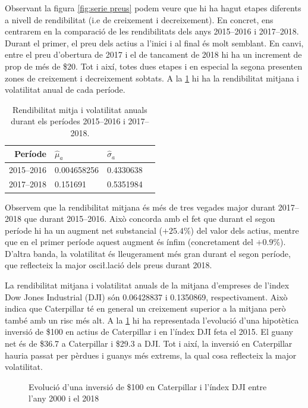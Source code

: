 \documentclass{article}
\numberwithin{table}{section}
\numberwithin{figure}{section}
\numberwithin{equation}{section}
\begin{document}
Observant la figura \ref{fig:serie preus} podem veure que hi ha hagut etapes diferents a nivell de rendibilitat (i.e de creixement i decreixement). En concret, ens centrarem en la comparació de les rendibilitats dels anys 2015--2016 i 2017--2018. Durant el primer, el preu dels actius a l'inici i al final és molt semblant. En canvi, entre el preu d'obertura de 2017 i el de tancament de 2018 hi ha un increment de prop de més de \$20. Tot i així, totes dues etapes i en especial la segona presenten zones de creixement i decreixement sobtats. A la \cref{tab:estim} hi ha la rendibilitat mitjana i volatilitat anual de cada període. 
\begin{table}[htb]
	\small \sffamily \centering
	\caption{Rendibilitat mitja i volatilitat anuals durant els períodes 2015--2016 i 2017--2018.}
	\label{tab:estim}
	\begin{tabular}{@{}rlll@{}}
		\toprule 
		Període & \( \hat{\mu}_a \) & \( \hat{\sigma}_a \) \\
		\midrule
		2015--2016 & \num{0.004658256} & \num{0.4330638} \\ 
		2017--2018 & \num{0.151691}   & \num{0.5351984}   \\ 
	\end{tabular}
\end{table}
Observem que la rendibilitat mitjana és més de tres vegades major durant 2017--2018 que durant 2015--2016. Això concorda amb el fet que durant el segon període hi ha un augment net substancial ($+25.4\%$) del valor dels actius, mentre que en el primer període aquest augment és ínfim (concretament del $+0.9\%$). D'altra banda, la volatilitat és lleugerament més gran durant el segon període, que reflecteix la major osci\l.lació dels preus durant 2018. 

La rendibilitat mitjana i volatilitat anuals de la mitjana d'empreses de l'index Dow Jones Industrial (DJI) són \num{0.06428837} i \num{0.1350869}, respectivament. Això indica que Caterpillar té en general un creixement superior a la mitjana però també amb un risc més alt. A la \cref{fig:inversio} hi ha representada l'evolució d'una hipotètica inversió de \$100 en actius de Caterpillar i en l'índex DJI feta el 2015. El guany net és de \$36.7 a Caterpillar i \$29.3 a DJI. Tot i així, la inversió en Caterpillar hauria passat per pèrdues i guanys més extrems, la qual cosa reflecteix la major volatilitat.
\begin{figure}[htb]
	\centering \sffamily \small
	
	\caption{Evolució d'una inversió de \$100 en Caterpillar i l'índex DJI entre l'any 2000 i el 2018}
	\label{fig:inversio}
\end{figure}
\end{document}
